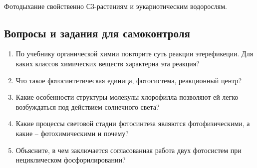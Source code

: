 \paragraph*{}Фотодыхание свойственно С3-растениям и эукариотическим водорослям.

\subsection*{Вопросы и задания для самоконтроля}

\begin{enumerate}
	\item По учебнику органической химии повторите суть реакции \hypertarget{eterefication}{этерефикеции}. Для каких классов химических веществ характерна эта реакция?

	\item Что такое \hyperlink{question_photo_unit}{фотосинтетическая единица}, фотосистема, реакционный центр?

	\item Какие особенности \hypertarget{question_bounds}{структуры} молекулы хлорофилла позволяют ей легко возбуждаться под действием солнечного света?

	\item Какие процессы световой стадии фотосинтеза являются \hypertarget{question_chem_phys}{фотофизическими}, а какие -- фотохимическими и почему?

	\item Объясните, в чем заключается \hypertarget{question_photocooperation}{согласованная} работа двух фотосистем при нециклическом фосфорилировании?
\end{enumerate}